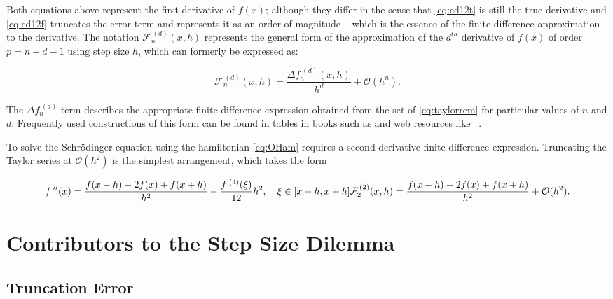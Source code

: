 Both equations above represent the first derivative of $f(x)$; although they differ in the sense that \cref{eq:cd12t} is still the true derivative and \cref{eq:cd12f} truncates the error term and represents it as an order of magnitude -- which is the essence of the finite difference approximation to the derivative.
The notation $\mathcal{F}_n^{\,(d)}(x,h)$ represents the general form of the approximation of the $d^{th}$ derivative of $f(x)$ of order $p = n+d-1$ using step size $h$, which can formerly be expressed as:

\begin{equation}
\mathcal{F}_n^{\,(d)}(x,h) = \frac{\Delta f_n^{\;(d)}(x,h)}{h^d} + \mathcal{O}(h^n).\label{eq:cdgeneral}
\end{equation}

The $\Delta f_n^{\;(d)}$ term describes the appropriate finite difference expression obtained from the set of \cref{eq:taylorrem} for particular values of $n$ and $d$.
Frequently used constructions of this form can be found in tables in books such as \citeauthor{Mathews2004} and web resources like \citeauthor{Holoborodko2009}~\cite{Mathews2004,Holoborodko2009}.

To solve the Schr\"{o}dinger equation using the hamiltonian \cref{eq:OHam} requires a second derivative finite difference expression. 
Truncating the Taylor series at $\mathcal{O}(h^2)$ is the simplest arrangement, which takes the form

\begin{equation}
f^{\;\prime\prime}(x) = \frac{f(x-h)-2f(x)+f(x+h)}{h^2} - \frac{f^{\;(4)}(\xi)}{12}h^2, \quad \xi \in [x-h,x+h]\label{eq:cd22t} \\
\mathcal{F}_2^{\,(2)}(x,h) = \frac{f(x-h)-2f(x)+f(x+h)}{h^2} + \mathcal{O}(h^2).\label{eq:cd22f}
\end{equation}


\section{Contributors to the Step Size Dilemma}

\subsection{Truncation Error}

